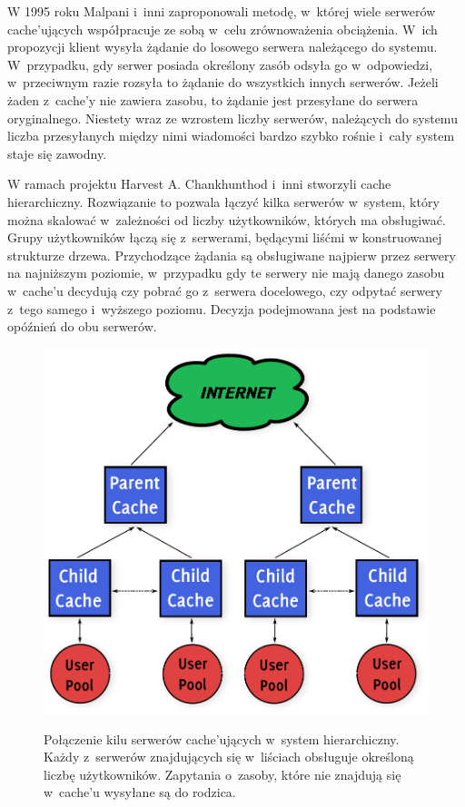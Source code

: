 \documentclass[a4paper,11pt]{scrartcl}
\newcommand{\s}{ }
\newcommand{\kesz}{cache}
\newcommand{\keszy}{cache'y}
\newcommand{\keszu}{cache'u}
\newcommand{\keszujacych}{cache'ujących}
\begin{document}
W 1995 roku Malpani i~inni \cite{malpani1995making} zaproponowali metodę, w~której wiele serwerów \keszujacych\s współpracuje ze sobą w~celu zrównoważenia obciążenia. W~ich propozycji klient wysyła żądanie do losowego serwera należącego do systemu. W~przypadku, gdy serwer posiada określony zasób odsyła go w~odpowiedzi, w~przeciwnym razie rozsyła to żądanie do wszystkich innych serwerów. Jeżeli żaden z~\keszy\s nie zawiera zasobu, to żądanie jest przesyłane do serwera oryginalnego. Niestety wraz ze wzrostem liczby serwerów, należących do systemu liczba przesyłanych między nimi wiadomości bardzo szybko rośnie i~cały system staje się zawodny.

W ramach projektu Harvest \cite{bowman1994harvest} A. Chankhunthod i~inni \cite{chankhunthod1995hierarchical} stworzyli \kesz\s hierarchiczny. Rozwiązanie to pozwala łączyć kilka serwerów w~system, który można skalować w~zależności od liczby użytkowników, których ma obsługiwać. Grupy użytkowników łączą się z~serwerami, będącymi liśćmi w konstruowanej strukturze drzewa. Przychodzące żądania są obsługiwane najpierw przez serwery na najniższym poziomie, w~przypadku gdy te serwery nie mają danego zasobu w~\keszu\s decydują czy pobrać go z~serwera docelowego, czy odpytać serwery z~tego samego i~wyższego poziomu. Decyzja podejmowana jest na podstawie opóźnień do obu serwerów.

\begin{figure}[h]
\centering
\includegraphics[width=0.8\linewidth]{img/hierarchical.pdf}
\label{fig_cache_hierarchical}
\caption{Połączenie kilu serwerów \keszujacych\s w~system hierarchiczny. Każdy z~serwerów znajdujących się w~liściach obsługuje określoną liczbę użytkowników. Zapytania o~zasoby, które nie znajdują się w~\keszu\s wysyłane są do rodzica.}
\end{figure}
\end{document}
